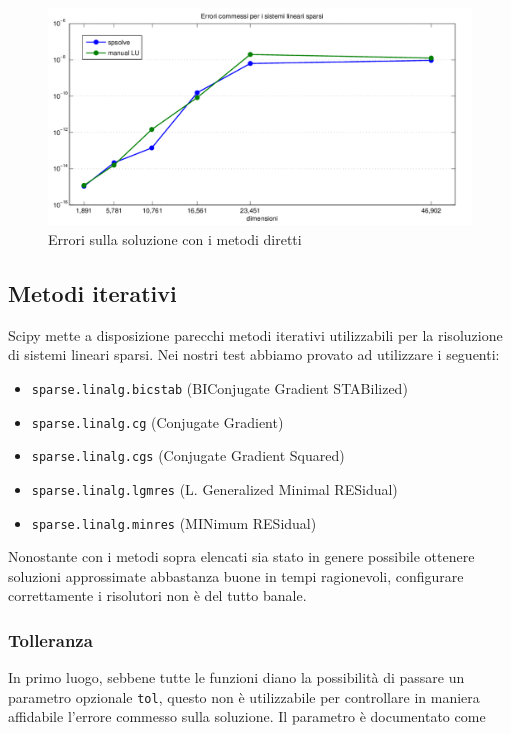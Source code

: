 \documentclass[11pt,a4paper]{scrartcl}
\begin{document}
\begin{figure}[!ht]
\centering
\includegraphics[scale=0.50]{images/errori_diretti} 
\caption{Errori sulla soluzione con i metodi diretti}
\label{errori_diretti}
\end{figure}

\subsection*{Metodi iterativi}
Scipy mette a disposizione parecchi metodi iterativi utilizzabili per la risoluzione di sistemi lineari sparsi. Nei nostri test abbiamo provato ad utilizzare i seguenti:
\begin{itemize}
	\item \texttt{sparse.linalg.bicstab} (BIConjugate Gradient STABilized)
	\item \texttt{sparse.linalg.cg} (Conjugate Gradient)
	\item \texttt{sparse.linalg.cgs} (Conjugate Gradient Squared)
	\item \texttt{sparse.linalg.lgmres} (L. Generalized Minimal RESidual)
	\item \texttt{sparse.linalg.minres} (MINimum RESidual)
\end{itemize}

Nonostante con i metodi sopra elencati sia stato in genere possibile ottenere soluzioni approssimate abbastanza buone in tempi ragionevoli, configurare correttamente i risolutori non è del tutto banale.

\subsubsection*{Tolleranza}

In primo luogo, sebbene tutte le funzioni diano la possibilità di passare un parametro opzionale \texttt{tol}, questo non è utilizzabile per controllare in maniera affidabile l'errore commesso sulla soluzione. Il parametro è documentato come
\end{document}
